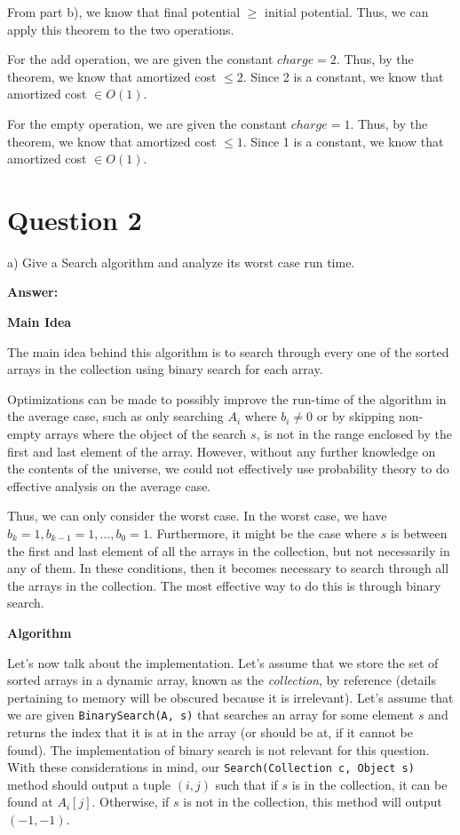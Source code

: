 \documentclass{article}
\begin{document}
From part b), we know that final potential $\geq$ initial potential. Thus, we can apply this theorem to the two
operations.

For the add operation, we are given the constant $charge = 2$. Thus, by the theorem, we know that amortized cost $\leq
2$. Since 2 is a constant, we know that amortized cost $\in O(1)$.

For the empty operation, we are given the constant $charge = 1$. Thus, by the theorem, we know that amortized cost $\leq
1$. Since 1 is a constant, we know that amortized cost $\in O(1)$.
\newline


\section{Question 2}

a) Give a Search algorithm and analyze its worst case run time.
\newline

\textbf{Answer:} \newline

\textbf{Main Idea}

The main idea behind this algorithm is to search through every one of the sorted arrays in the collection using
binary search for each array.

Optimizations can be made to possibly improve the run-time of the algorithm in the average case, such as
only searching $A_i$ where $b_i \neq 0$ or by skipping non-empty arrays where the object of the search $s$, is not in
the range enclosed by the first and last element of the array. However, without any further knowledge on the contents
of the universe, we could not effectively use probability theory to do effective analysis on the average case.

Thus, we can only consider the worst case. In the worst case, we have $b_k = 1, b_{k-1} = 1, \ldots, b_0 = 1$. Furthermore,
it might be the case where $s$ is between the first and last element of all the arrays in the collection,
but not necessarily in any of them. In these conditions, then it becomes necessary to search through all the arrays
in the collection. The most effective way to do this is through binary search.
\newline

\textbf{Algorithm}

Let's now talk about the implementation. Let's assume that we store the set of sorted arrays in a dynamic
array, known as the \textit{collection}, by reference (details pertaining to memory will be obscured because
it is irrelevant). Let's assume that we are given \texttt{BinarySearch(A, s)} that searches an array for some element
$s$ and returns the index that it is at in the array (or should be at, if it cannot be found).
The implementation of binary search is not relevant for this question. With these considerations in mind, our
\texttt{Search(Collection c, Object s)} method should output a tuple $(i, j)$ such that if $s$ is in the collection,
it can be found at $A_{i}[j]$. Otherwise, if $s$ is not in the collection, this method will output $(-1, -1)$.
\end{document}

